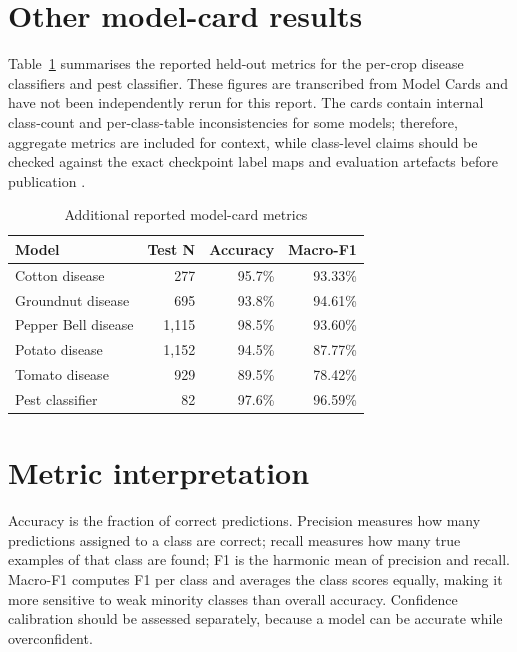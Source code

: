 \documentclass[12pt,a4paper,oneside,openany]{report}
\begin{document}
\section{Other model-card results}
Table~\ref{tab:modelcards} summarises the reported held-out metrics for the per-crop disease classifiers and pest classifier. These figures are transcribed from Model Cards and have not been independently rerun for this report. The cards contain internal class-count and per-class-table inconsistencies for some models; therefore, aggregate metrics are included for context, while class-level claims should be checked against the exact checkpoint label maps and evaluation artefacts before publication \cite{model_cards}.
\begin{table}[htbp]
\centering
\caption{Additional reported model-card metrics}
\label{tab:modelcards}
\begin{tabular}{lrrr}
\toprule
\textbf{Model} & \textbf{Test N} & \textbf{Accuracy} & \textbf{Macro-F1}\\
\midrule
Cotton disease & 277 & 95.7\% & 93.33\%\\
Groundnut disease & 695 & 93.8\% & 94.61\%\\
Pepper Bell disease & 1,115 & 98.5\% & 93.60\%\\
Potato disease & 1,152 & 94.5\% & 87.77\%\\
Tomato disease & 929 & 89.5\% & 78.42\%\\
Pest classifier & 82 & 97.6\% & 96.59\%\\
\bottomrule
\end{tabular}
\end{table}

\section{Metric interpretation}
Accuracy is the fraction of correct predictions. Precision measures how many predictions assigned to a class are correct; recall measures how many true examples of that class are found; F1 is the harmonic mean of precision and recall. Macro-F1 computes F1 per class and averages the class scores equally, making it more sensitive to weak minority classes than overall accuracy. Confidence calibration should be assessed separately, because a model can be accurate while overconfident.

\clearpage
\end{document}
